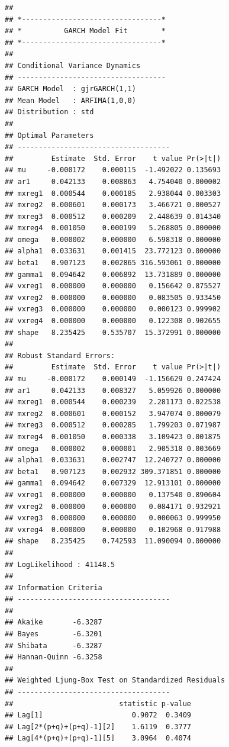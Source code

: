 \documentclass[
  11pt,
]{article}
\begin{document}
\begin{verbatim}
## 
## *---------------------------------*
## *          GARCH Model Fit        *
## *---------------------------------*
## 
## Conditional Variance Dynamics    
## -----------------------------------
## GARCH Model  : gjrGARCH(1,1)
## Mean Model   : ARFIMA(1,0,0)
## Distribution : std 
## 
## Optimal Parameters
## ------------------------------------
##         Estimate  Std. Error    t value Pr(>|t|)
## mu     -0.000172    0.000115  -1.492022 0.135693
## ar1     0.042133    0.008863   4.754040 0.000002
## mxreg1  0.000544    0.000185   2.938044 0.003303
## mxreg2  0.000601    0.000173   3.466721 0.000527
## mxreg3  0.000512    0.000209   2.448639 0.014340
## mxreg4  0.001050    0.000199   5.268805 0.000000
## omega   0.000002    0.000000   6.598318 0.000000
## alpha1  0.033631    0.001415  23.772123 0.000000
## beta1   0.907123    0.002865 316.593061 0.000000
## gamma1  0.094642    0.006892  13.731889 0.000000
## vxreg1  0.000000    0.000000   0.156642 0.875527
## vxreg2  0.000000    0.000000   0.083505 0.933450
## vxreg3  0.000000    0.000000   0.000123 0.999902
## vxreg4  0.000000    0.000000   0.122308 0.902655
## shape   8.235425    0.535707  15.372991 0.000000
## 
## Robust Standard Errors:
##         Estimate  Std. Error    t value Pr(>|t|)
## mu     -0.000172    0.000149  -1.156629 0.247424
## ar1     0.042133    0.008327   5.059926 0.000000
## mxreg1  0.000544    0.000239   2.281173 0.022538
## mxreg2  0.000601    0.000152   3.947074 0.000079
## mxreg3  0.000512    0.000285   1.799203 0.071987
## mxreg4  0.001050    0.000338   3.109423 0.001875
## omega   0.000002    0.000001   2.905318 0.003669
## alpha1  0.033631    0.002747  12.240727 0.000000
## beta1   0.907123    0.002932 309.371851 0.000000
## gamma1  0.094642    0.007329  12.913101 0.000000
## vxreg1  0.000000    0.000000   0.137540 0.890604
## vxreg2  0.000000    0.000000   0.084171 0.932921
## vxreg3  0.000000    0.000000   0.000063 0.999950
## vxreg4  0.000000    0.000000   0.102968 0.917988
## shape   8.235425    0.742593  11.090094 0.000000
## 
## LogLikelihood : 41148.5 
## 
## Information Criteria
## ------------------------------------
##                     
## Akaike       -6.3287
## Bayes        -6.3201
## Shibata      -6.3287
## Hannan-Quinn -6.3258
## 
## Weighted Ljung-Box Test on Standardized Residuals
## ------------------------------------
##                         statistic p-value
## Lag[1]                     0.9072  0.3409
## Lag[2*(p+q)+(p+q)-1][2]    1.6119  0.3777
## Lag[4*(p+q)+(p+q)-1][5]    3.0964  0.4074

\end{verbatim}
\end{document}
